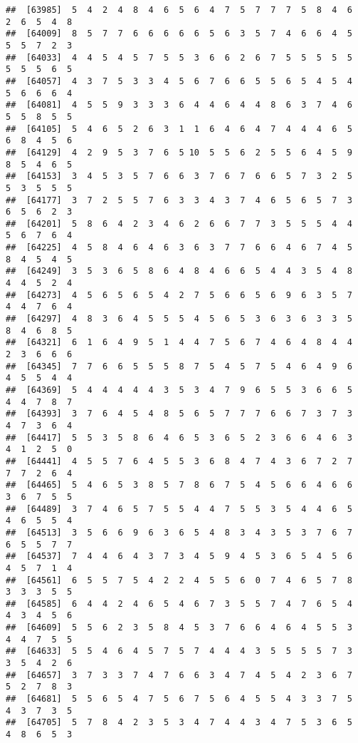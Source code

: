 \documentclass[
]{book}
\begin{document}
\begin{verbatim}
##  [63985]  5  4  2  4  8  4  6  5  6  4  7  5  7  7  7  5  8  4  6  2  6  5  4  8
##  [64009]  8  5  7  7  6  6  6  6  6  5  6  3  5  7  4  6  6  4  5  5  5  7  2  3
##  [64033]  4  4  5  4  5  7  5  5  3  6  6  2  6  7  5  5  5  5  5  5  5  5  6  5
##  [64057]  4  3  7  5  3  3  4  5  6  7  6  6  5  5  6  5  4  5  4  5  6  6  6  4
##  [64081]  4  5  5  9  3  3  3  6  4  4  6  4  4  8  6  3  7  4  6  5  5  8  5  5
##  [64105]  5  4  6  5  2  6  3  1  1  6  4  6  4  7  4  4  4  6  5  6  8  4  5  6
##  [64129]  4  2  9  5  3  7  6  5 10  5  5  6  2  5  5  6  4  5  9  8  5  4  6  5
##  [64153]  3  4  5  3  5  7  6  6  3  7  6  7  6  6  5  7  3  2  5  5  3  5  5  5
##  [64177]  3  7  2  5  5  7  6  3  3  4  3  7  4  6  5  6  5  7  3  6  5  6  2  3
##  [64201]  5  8  6  4  2  3  4  6  2  6  6  7  7  3  5  5  5  4  4  5  6  7  6  4
##  [64225]  4  5  8  4  6  4  6  3  6  3  7  7  6  6  4  6  7  4  5  8  4  5  4  5
##  [64249]  3  5  3  6  5  8  6  4  8  4  6  6  5  4  4  3  5  4  8  4  4  5  2  4
##  [64273]  4  5  6  5  6  5  4  2  7  5  6  6  5  6  9  6  3  5  7  4  4  7  6  4
##  [64297]  4  8  3  6  4  5  5  5  4  5  6  5  3  6  3  6  3  3  5  8  4  6  8  5
##  [64321]  6  1  6  4  9  5  1  4  4  7  5  6  7  4  6  4  8  4  4  2  3  6  6  6
##  [64345]  7  7  6  6  5  5  5  8  7  5  4  5  7  5  4  6  4  9  6  4  5  5  4  4
##  [64369]  5  4  4  4  4  4  3  5  3  4  7  9  6  5  5  3  6  6  5  4  4  7  8  7
##  [64393]  3  7  6  4  5  4  8  5  6  5  7  7  7  6  6  7  3  7  3  4  7  3  6  4
##  [64417]  5  5  3  5  8  6  4  6  5  3  6  5  2  3  6  6  4  6  3  4  1  2  5  0
##  [64441]  4  5  5  7  6  4  5  5  3  6  8  4  7  4  3  6  7  2  7  7  7  2  6  4
##  [64465]  5  4  6  5  3  8  5  7  8  6  7  5  4  5  6  6  4  6  6  3  6  7  5  5
##  [64489]  3  7  4  6  5  7  5  5  4  4  7  5  5  3  5  4  4  6  5  4  6  5  5  4
##  [64513]  3  5  6  6  9  6  3  6  5  4  8  3  4  3  5  3  7  6  7  6  5  5  7  7
##  [64537]  7  4  4  6  4  3  7  3  4  5  9  4  5  3  6  5  4  5  6  4  5  7  1  4
##  [64561]  6  5  5  7  5  4  2  2  4  5  5  6  0  7  4  6  5  7  8  3  3  3  5  5
##  [64585]  6  4  4  2  4  6  5  4  6  7  3  5  5  7  4  7  6  5  4  4  3  4  5  6
##  [64609]  5  5  6  2  3  5  8  4  5  3  7  6  6  4  6  4  5  5  3  4  4  7  5  5
##  [64633]  5  5  4  6  4  5  7  5  7  4  4  4  3  5  5  5  5  7  3  3  5  4  2  6
##  [64657]  3  7  3  3  7  4  7  6  6  3  4  7  4  5  4  2  3  6  7  5  2  7  8  3
##  [64681]  5  5  6  5  4  7  5  6  7  5  6  4  5  5  4  3  3  7  5  4  3  7  3  5
##  [64705]  5  7  8  4  2  3  5  3  4  7  4  4  3  4  7  5  3  6  5  4  8  6  5  3

\end{verbatim}
\end{document}
